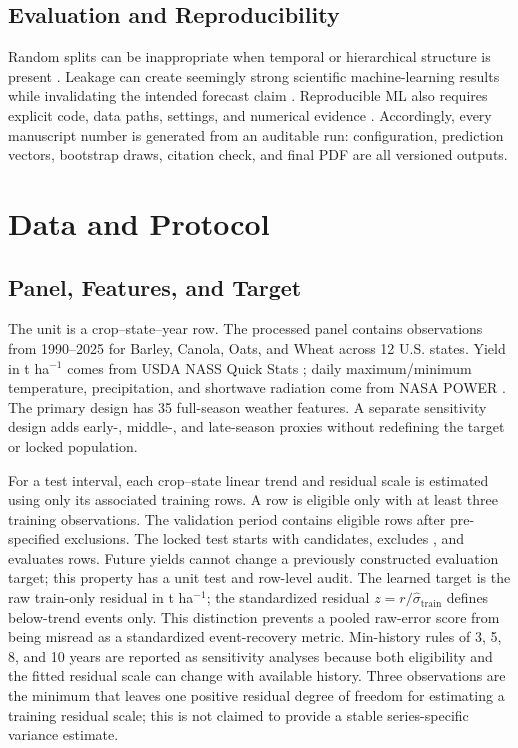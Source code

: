 \documentclass[conference]{IEEEtran}
\begin{document}
\subsection{Evaluation and Reproducibility}
Random splits can be inappropriate when temporal or hierarchical structure is
present \cite{Roberts2017}. Leakage can create seemingly strong scientific
machine-learning results while invalidating the intended forecast claim
\cite{KapoorNarayanan2023}. Reproducible ML also requires explicit code, data
paths, settings, and numerical evidence \cite{Pineau2021}. Accordingly, every
manuscript number is generated from an auditable run: configuration, prediction
vectors, bootstrap draws, citation check, and final PDF are all versioned outputs.

\section{Data and Protocol}
\subsection{Panel, Features, and Target}
The unit is a crop--state--year row. The processed panel contains \AuditTotalRows{}
observations from 1990--2025 for Barley, Canola, Oats, and Wheat across 12 U.S.
states. Yield in t ha$^{-1}$ comes from USDA NASS Quick Stats
\cite{USDANASSQuickStats}; daily maximum/minimum temperature, precipitation, and
shortwave radiation come from NASA POWER \cite{NASAPOWER2026}. The primary design
has 35 full-season weather features. A separate sensitivity design adds early-,
middle-, and late-season proxies without redefining the target or locked population.

\begin{table}[t]
\centering
\caption{Data-flow and final-test eligibility reconstructed from the raw inputs.}
\label{tab:dataflow}
\scriptsize
\resizebox{\columnwidth}{!}{}
\end{table}

For a test interval, each crop--state linear trend and residual scale is estimated
using only its associated training rows. A row is eligible only with at least three
training observations. The validation period contains \AuditValidationRows{} eligible
rows after \AuditValidationExcluded{} pre-specified exclusions. The locked test
starts with \AuditTestCandidateRows{} candidates, excludes \AuditTestExcluded{},
and evaluates \AuditTestRows{} rows. Future yields cannot change a previously
constructed evaluation target; this property has a unit test and row-level audit.
The learned target is the raw train-only residual in t ha$^{-1}$; the standardized
residual $z=r/\hat{\sigma}_{\mathrm{train}}$ defines below-trend events only.
This distinction prevents a pooled raw-error score from being misread as a
standardized event-recovery metric. Min-history rules of 3, 5, 8, and 10 years are
reported as sensitivity analyses because both eligibility and the fitted residual
scale can change with available history. Three observations are the minimum that
leaves one positive residual degree of freedom for estimating a training residual
scale; this is not claimed to provide a stable series-specific variance estimate.
\end{document}
